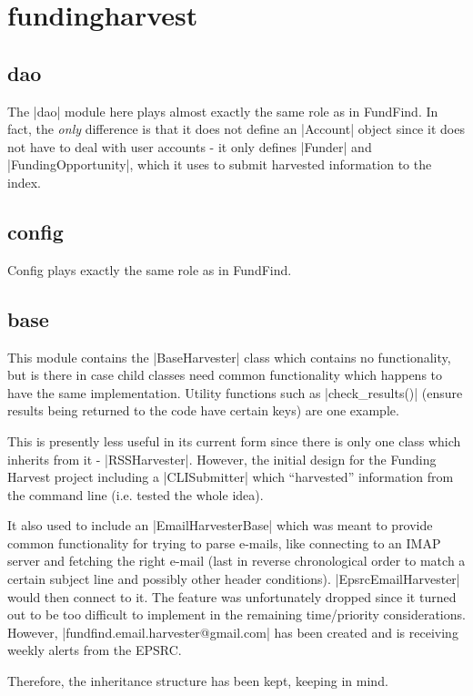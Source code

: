 \section{fundingharvest}
\label{design-main-last}

\subsection{dao}
The |dao| module here plays almost exactly the same role as in FundFind. In fact, the \emph{only} difference is that it does not define an |Account| object since it does not have to deal with user accounts - it only defines |Funder| and |FundingOpportunity|, which it uses to submit harvested information to the index.

\subsection{config}
Config plays exactly the same role as in FundFind.

\subsection{base}
\label{design-fundingharvest-base}
This module contains the |BaseHarvester| class which contains no functionality, but is there in case child classes need common functionality which happens to have the same implementation. Utility functions such as |check_results()| (ensure results being returned to the code have certain keys) are one example.

This is presently less useful in its current form since there is only one class which inherits from it - |RSSHarvester|. However, the initial design for the Funding Harvest project including a |CLISubmitter| which ``harvested'' information from the command line (i.e. tested the whole idea).

It also used to include an |EmailHarvesterBase| which was meant to provide common functionality for trying to parse e-mails, like connecting to an IMAP server and fetching the right e-mail (last in reverse chronological order to match a certain subject line and possibly other header conditions). |EpsrcEmailHarvester| would then connect to it. The feature was unfortunately dropped since it turned out to be too difficult to implement in the remaining time/priority considerations. However, |fundfind.email.harvester@gmail.com| has been created and is receiving weekly alerts from the EPSRC.

Therefore, the inheritance structure has been kept, keeping  in mind.

